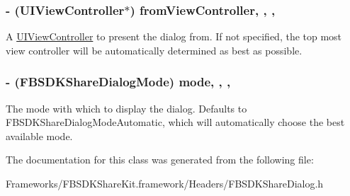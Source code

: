 \subsubsection[{from\+View\+Controller}]{\setlength{\rightskip}{0pt plus 5cm}-\/ (U\+I\+View\+Controller$\ast$) from\+View\+Controller\hspace{0.3cm}{\ttfamily [read]}, {\ttfamily [write]}, {\ttfamily [nonatomic]}, {\ttfamily [weak]}}\label{interface_f_b_s_d_k_share_dialog_a1319782aa7ce9db59c35ac6a9bb9a2c9}
A \hyperlink{class_u_i_view_controller-p}{U\+I\+View\+Controller} to present the dialog from.  If not specified, the top most view controller will be automatically determined as best as possible. \hypertarget{interface_f_b_s_d_k_share_dialog_a2fa09cba91a90a644c2cd8dd26de372d}{}
\subsubsection[{mode}]{\setlength{\rightskip}{0pt plus 5cm}-\/ (F\+B\+S\+D\+K\+Share\+Dialog\+Mode) mode\hspace{0.3cm}{\ttfamily [read]}, {\ttfamily [write]}, {\ttfamily [nonatomic]}, {\ttfamily [assign]}}\label{interface_f_b_s_d_k_share_dialog_a2fa09cba91a90a644c2cd8dd26de372d}
The mode with which to display the dialog.  Defaults to F\+B\+S\+D\+K\+Share\+Dialog\+Mode\+Automatic, which will automatically choose the best available mode. 

The documentation for this class was generated from the following file\+:\begin{DoxyCompactItemize}
\item 
Frameworks/\+F\+B\+S\+D\+K\+Share\+Kit.\+framework/\+Headers/F\+B\+S\+D\+K\+Share\+Dialog.\+h\end{DoxyCompactItemize}
